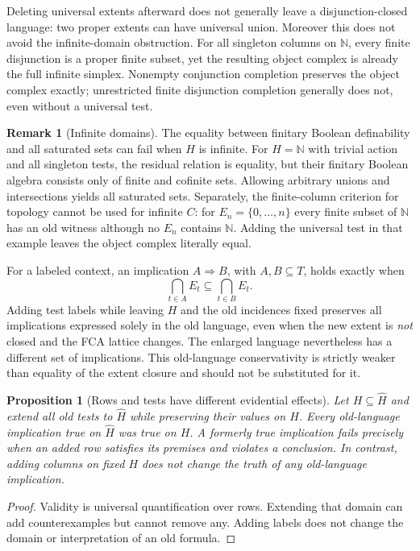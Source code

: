 \documentclass[11pt]{article}
\newtheorem{proposition}[theorem]{Proposition}
\theoremstyle{definition}
\newtheorem{remark}[theorem]{Remark}
\begin{document}
Deleting universal extents afterward does not generally leave a
disjunction-closed language: two proper extents can have universal union.
Moreover this does not avoid the infinite-domain obstruction. For all
singleton columns on $\mathbb N$, every finite disjunction is a proper
finite subset, yet the resulting object complex is already the full
infinite simplex. Nonempty conjunction completion preserves the object
complex exactly; unrestricted finite disjunction completion generally
does not, even without a universal test.

\begin{remark}[Infinite domains]
The equality between finitary Boolean definability and all saturated sets
can fail when $H$ is infinite. For $H=\mathbb N$ with trivial action and
all singleton tests, the residual relation is equality, but their
finitary Boolean algebra consists only of finite and cofinite sets.
Allowing arbitrary unions and intersections yields all saturated sets.
Separately, the finite-column criterion for topology cannot be used for
infinite $C$: for $E_n=\{0,\ldots,n\}$ every finite subset of $\mathbb N$
has an old witness although no $E_n$ contains $\mathbb N$. Adding the
universal test in that example leaves the object complex literally equal.
\end{remark}

For a labeled context, an implication $A\Rightarrow B$, with
$A,B\subseteq T$, holds exactly when
\[
 \bigcap_{t\in A}E_t\subseteq\bigcap_{t\in B}E_t.
\]
Adding test labels while leaving $H$ and the old incidences fixed preserves
all implications expressed solely in the old language, even when the new
extent is \emph{not} closed and the FCA lattice changes. The enlarged
language nevertheless has a different set of implications. This
old-language conservativity is strictly weaker than equality of the extent
closure and should not be substituted for it.

\begin{proposition}[Rows and tests have different evidential effects]
Let $H\subseteq\widehat H$ and extend all old tests to $\widehat H$ while
preserving their values on $H$. Every old-language implication true on
$\widehat H$ was true on $H$. A formerly true implication fails precisely
when an added row satisfies its premises and violates a conclusion.
In contrast, adding columns on fixed $H$ does not change the truth of any
old-language implication.
\end{proposition}
\begin{proof}
Validity is universal quantification over rows. Extending that domain can
add counterexamples but cannot remove any. Adding labels does not change
the domain or interpretation of an old formula.
\end{proof}
\end{document}
